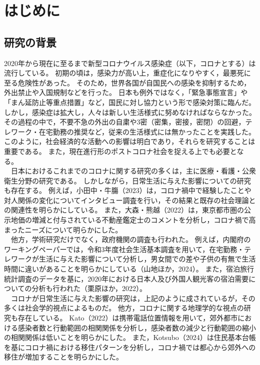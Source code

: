 \documentclass[paper={210mm,297mm},line_length=35zw,number_of_lines=31,head_space=30mm,gutter=40mm,baselineskip=2.0zw,headfoot_verticalposition=1.5zw]{jlreq}
\begin{document}
\tableofcontents
\newpage

\section{はじめに}

\subsection{研究の背景}

2020年から現在に至るまで新型コロナウイルス感染症（以下，コロナとする）は流行している。
初期の頃は，感染力が高い上，重症化になりやすく，最悪死に至る危険性があった。
そのため，世界各国が自国民への感染を抑制するため，外出禁止や入国規制などを行った。
日本も例外ではなく，「緊急事態宣言」や「まん延防止等重点措置」など，国民に対し協力という形で感染対策に臨んだ。
しかし，感染症は拡大し，人々は新しい生活様式に努めなければならなかった。
その過程の中で，不要不急の外出の自粛や3密（密集，密接，密閉）の回避，テレワーク・在宅勤務の推奨など，従来の生活様式には無かったことを実践した。
このように，社会経済的な活動への影響は明白であり，それらを研究することは重要である。
また，現在進行形のポストコロナ社会を捉える上でも必要となる。\\
　日本におけるこれまでのコロナに関する研究の多くは，主に医療・看護・公衆衛生分野の研究である。
しかしながら，日常生活に与えた影響についての研究も存在する。
例えば，小田中・牛膓（2023）は，コロナ禍中で経験したことや対人関係の変化についてインタビュー調査を行い，その結果と既存の社会理論との関連性を明らかにしている。
また，大森・熊越（2022）は，東京都市圏の公示地価の増減と付与されている不動産鑑定士のコメントを分析し，コロナ禍で高まったニーズについて明らかにした。\\
　他方，学術研究だけでなく，政府機関の調査も行われた。
例えば，内閣府のワーキングペーパーでは，令和3年度社会生活基本調査を用いて，在宅勤務・テレワークが生活に与えた影響について分析し，男女間での差や子供の有無で生活時間に違いがあることを明らかにしている（山地ほか，2024）。
また，宿泊旅行統計調査のデータを基に，2020年における日本人及び外国人観光客の宿泊需要についての分析も行われた（栗原ほか，2022）。\\
　コロナが日常生活に与えた影響の研究は，上記のように成されているが，その多くは社会学的視点によるものだ。
他方，コロナに関する地理学的な視点の研究も存在している。
Kato（2022）は携帯電話位置情報を用いて，郊外都市における感染者数と行動範囲の相関関係を分析し，感染者数の減少と行動範囲の縮小の相関関係は低いことを明らかにした。
また，Kotsubo（2024）は住民基本台帳を基にコロナ禍における移住パターンを分析し，コロナ禍では都心から郊外への移住が増加することを明らかにした。
\end{document}
